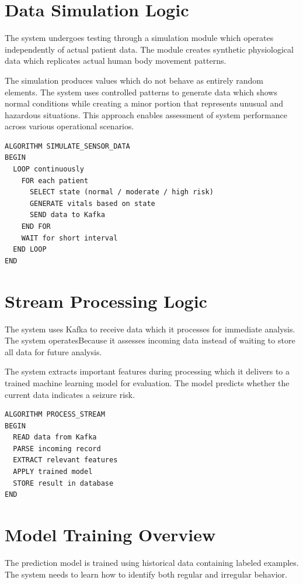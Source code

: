 \documentclass[12pt, a4paper, oneside]{report}
\begin{document}
\section{Data Simulation Logic}

The system undergoes testing through a simulation module which operates independently of actual patient data. The module creates synthetic physiological data which replicates actual human body movement patterns.

The simulation produces values which do not behave as entirely random elements. The system uses controlled patterns to generate data which shows normal conditions while creating a minor portion that represents unusual and hazardous situations. This approach enables assessment of system performance across various operational scenarios.

\begin{lstlisting}
ALGORITHM SIMULATE_SENSOR_DATA
BEGIN
  LOOP continuously
    FOR each patient
      SELECT state (normal / moderate / high risk)
      GENERATE vitals based on state
      SEND data to Kafka
    END FOR
    WAIT for short interval
  END LOOP
END
\end{lstlisting}

\section{Stream Processing Logic}

The system uses Kafka to receive data which it processes for immediate analysis. The system operatesBecause it assesses incoming data instead of waiting to store all data for future analysis.

The system extracts important features during processing which it delivers to a trained machine learning model for evaluation. The model predicts whether the current data indicates a seizure risk.

\begin{lstlisting}
ALGORITHM PROCESS_STREAM
BEGIN
  READ data from Kafka
  PARSE incoming record
  EXTRACT relevant features
  APPLY trained model
  STORE result in database
END
\end{lstlisting}

\section{Model Training Overview}

The prediction model is trained using historical data containing labeled examples. The system needs to learn how to identify both regular and irregular behavior.
\end{document}
